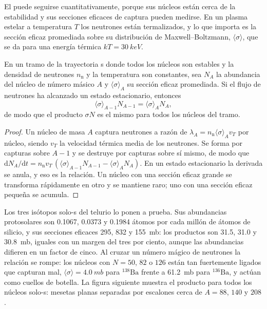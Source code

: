 El  puede seguirse cuantitativamente, porque sus núcleos están cerca
de la estabilidad y sus secciones eficaces de captura pueden medirse. En un plasma estelar
a temperatura $T$ los neutrones están termalizados, y lo que importa es la
sección eficaz promediada sobre su distribución de Maxwell--Boltzmann,
$\langle\sigma\rangle$, que se da para una energía térmica
$kT = \qty{30}{keV}$.

\begin{proposition}\label{prop:b3:origin-of-elements:sigma-n}
En un tramo de la trayectoria s donde todos los núcleos son estables y la
densidad de neutrones $n_\mathrm{n}$ y la temperatura son constantes, sea $N_A$ la
abundancia del núcleo de número másico $A$ y $\langle\sigma\rangle_A$ su
sección eficaz promediada. Si el flujo de neutrones ha alcanzado un
estado estacionario, entonces
\[
\langle\sigma\rangle_{A-1} N_{A-1} = \langle\sigma\rangle_A N_A ,
\]
de modo que el producto $\sigma N$ es el mismo para todos los núcleos del
tramo.
\end{proposition}

\begin{proof}
Un núcleo de masa $A$ captura neutrones a razón de
$\lambda_A = n_\mathrm{n}\langle\sigma\rangle_A v_T$ por núcleo, siendo
$v_T$ la velocidad térmica media de los neutrones. Se forma por capturas sobre
$A - 1$ y se destruye por capturas sobre sí mismo, de modo que
$\mathrm{d}N_A/\mathrm{d}t = n_\mathrm{n} v_T\,(\langle\sigma\rangle_{A-1}
N_{A-1} - \langle\sigma\rangle_A N_A)$. En un estado estacionario la derivada
se anula, y eso es la relación. Un núcleo con una sección eficaz grande
se transforma rápidamente en otro y se mantiene raro; uno con una sección eficaz pequeña
se acumula.
\end{proof}

Los tres isótopos solo-s del telurio lo ponen a prueba. Sus
abundancias protosolares son \num{0.1067}, \num{0.0373} y \num{0.1984} átomos por
cada millón de átomos de silicio, y sus secciones eficaces \num{295}, \num{832} y
\qty{155}{mb}: los productos son \num{31.5}, \num{31.0} y
\qty{30.8}{mb}, iguales con un margen del tres por ciento, aunque las abundancias
difieren en un factor de cinco. Al cruzar un número mágico de neutrones la
relación se rompe: los núcleos con $N = 50$, $82$ o $126$ están tan fuertemente ligados que
capturan mal, $\langle\sigma\rangle = \qty{4.0}{mb}$ para
$^{138}\mathrm{Ba}$ frente a \qty{61.2}{mb} para $^{136}\mathrm{Ba}$, y
actúan como cuellos de botella. La figura siguiente muestra el producto para todos los
núcleos solo-s: mesetas planas separadas por escalones cerca de $A = 88$, $140$
y $208$.

